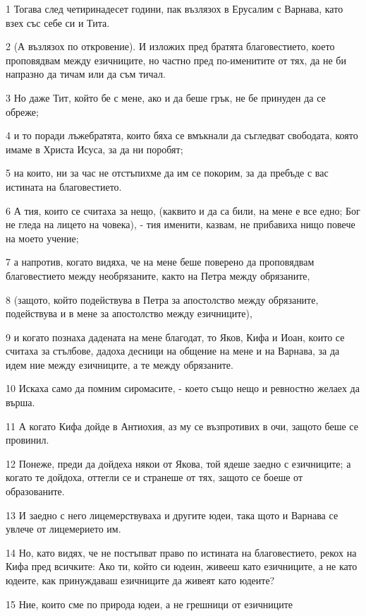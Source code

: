 \par 1 Тогава след четиринадесет години, пак възлязох в Ерусалим с Варнава, като взех със себе си и Тита.
\par 2 (А възлязох по откровение). И изложих пред братята благовестието, което проповядвам между езичниците, но частно пред по-именитите от тях, да не би напразно да тичам или да съм тичал.
\par 3 Но даже Тит, който бе с мене, ако и да беше грък, не бе принуден да се обреже;
\par 4 и то поради лъжебратята, които бяха се вмъкнали да съгледват свободата, която имаме в Христа Исуса, за да ни поробят;
\par 5 на които, ни за час не отстъпихме да им се покорим, за да пребъде с вас истината на благовестието.
\par 6 А тия, които се считаха за нещо, (каквито и да са били, на мене е все едно; Бог не гледа на лицето на човека), - тия именити, казвам, не прибавиха нищо повече на моето учение;
\par 7 а напротив, когато видяха, че на мене беше поверено да проповядвам благовестието между необрязаните, както на Петра между обрязаните,
\par 8 (защото, който подействува в Петра за апостолство между обрязаните, подействува и в мене за апостолство между езичниците),
\par 9 и когато познаха дадената на мене благодат, то Яков, Кифа и Иоан, които се считаха за стълбове, дадоха десници на общение на мене и на Варнава, за да идем ние между езичниците, а те между обрязаните.
\par 10 Искаха само да помним сиромасите, - което също нещо и ревностно желаех да върша.
\par 11 А когато Кифа дойде в Антиохия, аз му се възпротивих в очи, защото беше се провинил.
\par 12 Понеже, преди да дойдеха някои от Якова, той ядеше заедно с езичниците; а когато те дойдоха, оттегли се и странеше от тях, защото се боеше от образованите.
\par 13 И заедно с него лицемерствуваха и другите юдеи, така щото и Варнава се увлече от лицемерието им.
\par 14 Но, като видях, че не постъпват право по истината на благовестието, рекох на Кифа пред всичките: Ако ти, който си юдеин, живееш като езичниците, а не като юдеите, как принуждаваш езичниците да живеят като юдеите?
\par 15 Ние, които сме по природа юдеи, а не грешници от езичниците
